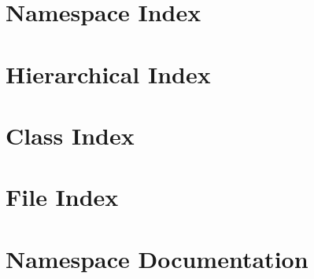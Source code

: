 \documentclass[twoside]{book}
\newcommand{\+}{\discretionary{\mbox{\scriptsize$\hookleftarrow$}}{}{}}
\begin{document}
  \raggedbottom
    \hypersetup{pageanchor=false,
                bookmarksnumbered=true
               }
  \hypersetup{pageanchor=true}

\chapter{Namespace Index}

\chapter{Hierarchical Index}

\chapter{Class Index}

\chapter{File Index}

\chapter{Namespace Documentation}




\end{document}
